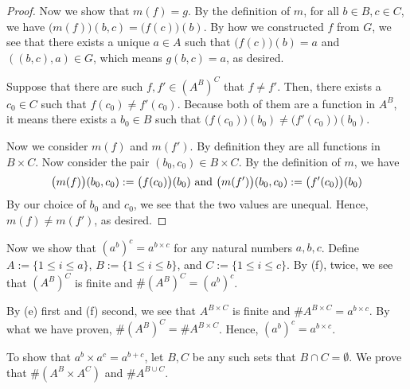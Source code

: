 \begin{proof}
	Now we show that $m(f) = g$. By the definition of $m$, for all $b \in B, c \in C$, we have $\bigl(m(f)\bigr)(b,c) = \bigl(f(c)\bigr)(b)$. By how we constructed $f$ from $G$, we see that there exists a unique $a \in A$ such that $\bigl(f(c)\bigr)(b) = a$ and $((b,c), a) \in G$, which means $g(b,c) = a$, as desired.
	
	 Suppose that there are such $f,f' \in (A^B)^C$ that $f \ne f'$. Then, there exists a $c_0 \in C$ such that $f(c_0) \ne f'(c_0)$. Because both of them are a function in $A^B$, it means there exists a $b_0 \in B$ such that $\bigl(f(c_0)\bigr)(b_0) \ne \bigl(f'(c_0)\bigr)(b_0)$.
	
	Now we consider $m(f)$ and $m(f')$. By definition they are all functions in $B \times C$. Now consider the pair $(b_0, c_0) \in B \times C$. By the definition of $m$, we have
	\[
		\bigl(m(f)\bigr)(b_0,c_0) := \bigl(f(c_0)\bigr)(b_0) \hbox{ and }
		\bigl(m(f')\bigr)(b_0,c_0) := \bigl(f'(c_0)\bigr)(b_0)
	\]
	By our choice of $b_0$ and $c_0$, we see that the two values are unequal. Hence,
	$m(f) \ne m(f')$, as desired.
\end{proof}

Now we show that $(a^b)^c = a^{b \times c}$ for any natural numbers $a,b,c$. Define $A := \{1 \le i \le a\}$, $B := \{1 \le i \le b\}$, and $C := \{1 \le i \le c\}$. By  (f), twice, we see that $(A^B)^C$ is finite and $\#(A^B)^C = (a^b)^c$.

By  (e) first and (f) second, we see that $A^{B \times C}$ is finite and $\#A^{B \times C} = a^{b \times c}$. By what we have proven, $\#(A^B)^C = \#A^{B \times C}$. Hence, $(a^b)^c = a^{b \times c}$.

To show that $a^b \times a^c = a^{b+c}$, let $B,C$ be any such sets that $B \cap C = \emptyset$. We prove that $\#(A^B \times A^C)$ and $\#A^{B \cup C}$.

